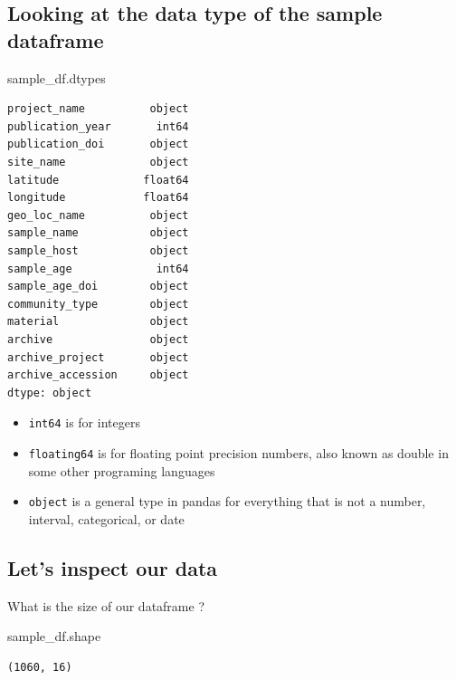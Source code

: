 \documentclass[
  letterpaper,
]{book}
\newenvironment{Shaded}{}{}
\newcommand{\NormalTok}[1]{\textcolor[rgb]{0.14,0.16,0.18}{#1}}
\providecommand{\tightlist}{%
  \setlength{\itemsep}{0pt}\setlength{\parskip}{0pt}}\usepackage{longtable,booktabs,array}
\begin{document}
\hypertarget{looking-at-the-data-type-of-the-sample-dataframe}{%
\subsection{Looking at the data type of the sample
dataframe}\label{looking-at-the-data-type-of-the-sample-dataframe}}

\begin{Shaded}
\begin{Highlighting}[]
\NormalTok{sample\_df.dtypes}
\end{Highlighting}
\end{Shaded}

\begin{verbatim}
project_name          object
publication_year       int64
publication_doi       object
site_name             object
latitude             float64
longitude            float64
geo_loc_name          object
sample_name           object
sample_host           object
sample_age             int64
sample_age_doi        object
community_type        object
material              object
archive               object
archive_project       object
archive_accession     object
dtype: object
\end{verbatim}

\begin{itemize}
\tightlist
\item
  \texttt{int64} is for integers
\item
  \texttt{floating64} is for floating point precision numbers, also
  known as double in some other programing languages
\item
  \texttt{object} is a general type in pandas for everything that is not
  a number, interval, categorical, or date
\end{itemize}

\hypertarget{lets-inspect-our-data}{%
\subsection{Let's inspect our data}\label{lets-inspect-our-data}}

What is the size of our dataframe ?

\begin{Shaded}
\begin{Highlighting}[]
\NormalTok{sample\_df.shape}
\end{Highlighting}
\end{Shaded}

\begin{verbatim}
(1060, 16)
\end{verbatim}
\end{document}

